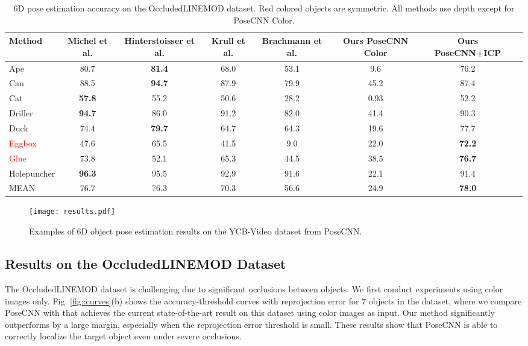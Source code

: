 \documentclass[conference]{IEEEtran}
\begin{document}
\begin{table*} \setlength{\tabcolsep}{4pt}
	\centering
	\caption{6D pose estimation accuracy on the OccludedLINEMOD dataset. Red colored objects are symmetric. All methods use depth except for PoseCNN Color.}
	\label{table:linemod}
	\begin{tabular}{|l|c|c|c|c|c|c|c|}
		\hline Method & Michel et al. \cite{michel2016global}  & Hinterstoisser et al. \cite{hinterstoisser2016going} & Krull et al. \cite{krull2015learning} & Brachmann et al. \cite{brachmann2014learning} & Ours PoseCNN Color & Ours PoseCNN+ICP \\ \hline
		\hline Ape & 80.7 &	\textbf{81.4} & 68.0 & 53.1 & 9.6 & 76.2 \\
		\hline Can & 88.5 & \textbf{94.7} & 87.9 & 79.9 & 45.2 & 87.4 \\
		\hline Cat & \textbf{57.8} & 55.2 & 50.6 & 28.2 & 0.93 & 52.2 \\
		\hline Driller & \textbf{94.7} &	86.0 & 91.2 &	82.0 &  41.4 & 90.3 \\
		\hline Duck &	74.4 &	\textbf{79.7 }&	64.7 &	64.3 &	19.6 & 77.7 \\
		\hline \textcolor{red}{Eggbox} &	47.6 &	65.5 &	41.5 &	9.0 & 22.0 &	\textbf{72.2} \\
		\hline \textcolor{red}{Glue}	& 73.8 &	52.1 &	65.3 &	44.5 &	38.5 &	\textbf{76.7} \\
		\hline Holepuncher &	\textbf{96.3} &	95.5 &	92.9 &	91.6 &	22.1 &	91.4 \\
		\hline
		\hline MEAN &	76.7 &	76.3 &	70.3 &	56.6 &	24.9 & \textbf{78.0} \\
		\hline
	\end{tabular}
	\vspace{-2mm}
\end{table*}

\begin{figure*}
	\centering
	\texttt{[image: results.pdf]}
	\caption{Examples of 6D object pose estimation results on the YCB-Video dataset from PoseCNN.}
	\label{fig::results}
	\vspace{-6mm}
\end{figure*}


\subsection{Results on the OccludedLINEMOD Dataset}

The OccludedLINEMOD dataset is challenging due to significant occlusions between objects. We first conduct experiments using color images only. Fig. \ref{fig::curves}(b) shows the accuracy-threshold curves with reprojection error for 7 objects in the dataset, where we compare PoseCNN with \cite{tekin2017real} that achieves the current state-of-the-art result on this dataset using color images as input. Our method significantly outperforms \cite{tekin2017real} by a large margin, especially when the reprojection error threshold is small. These results show that PoseCNN is able to correctly localize the target object even under severe occlusions.
\end{document}
